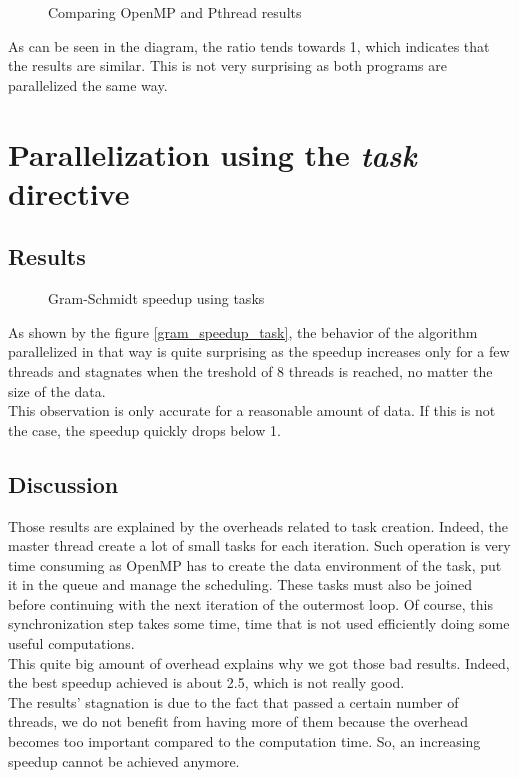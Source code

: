 \begin{figure}[ht]
  \begin{center}
  \end{center}
  \caption{Comparing OpenMP and Pthread results}
  \label{fig:gram_pthread}
\end{figure} 

As can be seen in the diagram, the ratio tends towards 1, which indicates that the results are similar. This is not very surprising as both programs are parallelized the same way. 

\section{Parallelization using the \textit{task} directive}

\subsection{Results}

\begin{figure}[ht]
  \begin{center}
  \end{center}
  \caption{Gram-Schmidt speedup using tasks}
  \label{fig:gram_speedup_task}
\end{figure} 

As shown by the figure \ref{gram_speedup_task}, the behavior of the algorithm parallelized in that way is quite surprising as the speedup increases only for a few threads and stagnates when the treshold of 8 threads is reached, no matter the size of the data.\\

This observation is only accurate for a reasonable amount of data. If this is not the case, the speedup quickly drops below 1.\\

\subsection{Discussion}

Those results are explained by the overheads related to task creation. Indeed, the master thread create a lot of small tasks for each iteration. Such operation is very time consuming as OpenMP has to create the data environment of the task, put it in the queue and manage the scheduling.  These tasks must also be joined before continuing with the next iteration of the outermost loop. Of course, this synchronization step takes some time, time that is not used efficiently doing some useful computations.\\

This quite big amount of overhead explains why we got those bad results. Indeed, the best speedup achieved is about 2.5, which is not really good.\\

The results' stagnation is due to the fact that passed a certain number of threads, we do not benefit from having more of them because the overhead becomes too important compared to the computation time. So, an increasing speedup cannot be achieved anymore.
